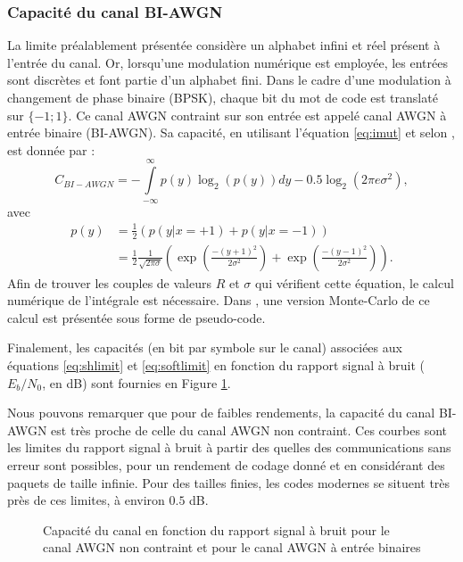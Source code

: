 \subsubsection{Capacité du canal BI-AWGN}
La limite préalablement présentée considère un alphabet infini et réel présent à l'entrée du canal. Or, lorsqu'une 
modulation numérique est employée, les entrées sont discrètes et font partie d'un alphabet fini. Dans le cadre d'une 
modulation à changement de phase binaire (BPSK), chaque bit du mot de code est translaté sur $\{-1;1\}$. Ce canal AWGN 
contraint sur son entrée est appelé canal AWGN à entrée binaire (BI-AWGN). Sa capacité, en utilisant l'équation 
\ref{eq:imut} et selon \cite[Chapitre 8]{ryan}, est donnée par : 
\begin{equation}\label{eq:softlimit}
	C_{BI-AWGN} = - \int\limits_{-\infty}^{\infty} p(y) \log_2\left(p(y)\right)dy - 0.5\log_2\left(2\pi e \sigma^2\right),
\end{equation}
avec 
\begin{align*}
	p(y) & = \frac{1}{2} \left(p(y|x=+1)+p(y|x=-1)\right)                                                    \\
	     & = \frac{1}{2} \frac{1}{\sqrt{2\pi \sigma}} \left( \exp \left(\frac{-(y+1)^2}{2\sigma ^2}\right) + 
	\exp \left(\frac{-(y-1)^2}{2\sigma ^2}\right)\right).
\end{align*}
Afin de trouver les couples de valeurs $R$ et $\sigma$ qui vérifient cette équation, le calcul numérique de l'intégrale 
est nécessaire. Dans \cite{johnson2009iterative}, une version Monte-Carlo de ce calcul est présentée sous forme de pseudo-code.

Finalement, les capacités (en bit par symbole sur le canal) associées aux équations \ref{eq:shlimit} et \ref{eq:softlimit}
en fonction du rapport signal à bruit ($E_b/N_0$, en dB) sont fournies en Figure \ref{fig:capacity}.

Nous pouvons remarquer que pour de faibles rendements, la capacité du canal BI-AWGN est très proche de celle du canal 
AWGN non contraint. Ces courbes sont les limites du rapport signal à bruit à partir des quelles des communications sans 
erreur sont possibles, pour un rendement de codage donné et en considérant des paquets de taille infinie. Pour des 
tailles finies, les codes modernes se situent très près de ces limites, à environ $0.5$ dB.
\begin{figure}[!h]
	\centering
	
	\caption{\label{fig:capacity} Capacité du canal en fonction du rapport signal à bruit pour le canal AWGN non contraint 
	et pour le canal AWGN à entrée binaires}
\end{figure}
